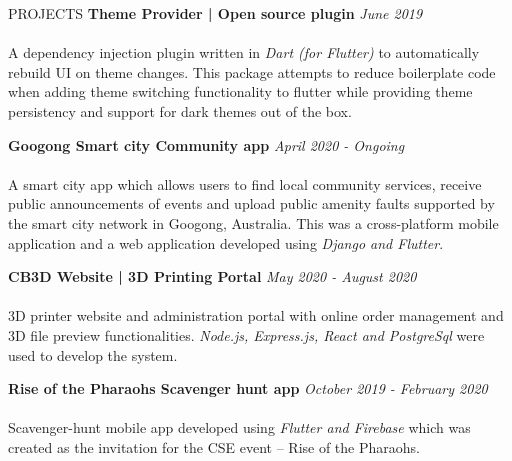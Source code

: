 \documentclass{cv}
\begin{document}
\begin{rSection}{PROJECTS}
    {\bf Theme Provider | Open source plugin}                       \hfill {\em June 2019}
    \\ \\
    A dependency injection plugin written in \textit{Dart (for Flutter)} to automatically rebuild
    UI on theme changes.
    This package attempts to reduce boilerplate code when adding theme switching functionality to flutter
    while providing theme persistency and support for dark themes out of the box. \par\vspace{3pt}

    {\bf Googong Smart city Community app}                  \hfill {\em April 2020 - Ongoing}
    \\ \\
    A smart city app which allows users to find local community services,
    receive public announcements of events and upload public amenity
    faults supported by the smart city network in Googong, Australia.
    This was a cross-platform mobile application and a web application developed
    using \textit{Django and Flutter}.
    \par\vspace{3pt}

    {\bf CB3D Website | 3D Printing Portal}                  \hfill {\em May 2020 - August 2020}
    \\ \\
    3D printer website and administration portal with online order management and 3D file preview functionalities.
    \textit{Node.js, Express.js, React and PostgreSql} were used to develop the system.
    \par\vspace{3pt}

    {\bf Rise of the Pharaohs Scavenger hunt app}                   \hfill {\em October 2019 - February 2020}
    \\ \\
    Scavenger-hunt mobile app developed using \textit{Flutter and Firebase} which was created as the invitation
    for the CSE event – Rise of the Pharaohs.  \par\vspace{3pt}


\end{rSection}
\end{document}
